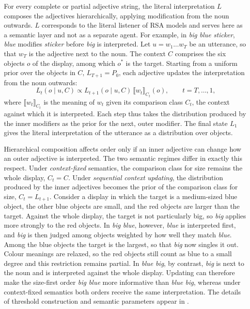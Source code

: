 \documentclass[10pt,a4paper,fleqn]{article}
\begin{document}
For every complete or partial adjective string, the literal interpretation $L$ composes the adjectives hierarchically, applying modification from the noun outwards.
$L$ corresponds to the literal listener of RSA models and serves here as a semantic layer and not as a separate agent.
For example, in \emph{big blue sticker}, \emph{blue} modifies \emph{sticker} before \emph{big} is interpreted.
Let $u=w_1\ldots w_T$ be an utterance, so that $w_T$ is the adjective next to the noun.
The context $C$ comprises the six objects $o$ of the display, among which $o^*$ is the target.
Starting from a uniform prior over the objects in $C$, $L_{T+1}=P_0$, each adjective updates the interpretation from the noun outwards:
\begin{equation}
  L_t(o\mid u,C)
  \propto
  L_{t+1}(o\mid u,C)\,
  \llbracket w_t\rrbracket_{C_t}(o),
  \qquad t=T,\ldots,1,
  \label{eq:hierarchical-composition}
\end{equation}
where $\llbracket w_t\rrbracket_{C_t}$ is the meaning of $w_t$ given its comparison class $C_t$, the context against which it is interpreted.
Each step thus takes the distribution produced by the inner modifiers as the prior for the next, outer modifier.
The final state $L_1$ gives the literal interpretation of the utterance as a distribution over objects.

Hierarchical composition affects order only if an inner adjective can change how an outer adjective is interpreted.
The two semantic regimes differ in exactly this respect.
Under \emph{context-fixed} semantics, the comparison class for size remains the whole display, $C_t=C$.
Under \emph{sequential context updating}, the distribution produced by the inner adjectives becomes the prior of the comparison class for size, $C_t=L_{t+1}$.
Consider a display in which the target is a medium-sized blue object, the other blue objects are small, and the red objects are larger than the target.
Against the whole display, the target is not particularly big, so \emph{big} applies more strongly to the red objects.
In \emph{big blue}, however, \emph{blue} is interpreted first, and \emph{big} is then judged among objects weighted by how well they match \emph{blue}.
Among the blue objects the target is the largest, so that \emph{big} now singles it out.
Colour meanings are relaxed, so the red objects still count as blue to a small degree and this restriction remains partial.
In \emph{blue big}, by contrast, \emph{big} is next to the noun and is interpreted against the whole display.
Updating can therefore make the size-first order \emph{big blue} more informative than \emph{blue big}, whereas under context-fixed semantics both orders receive the same interpretation.
The details of threshold construction and semantic parameters appear in .
\end{document}
